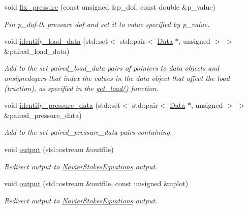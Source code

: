 \begin{DoxyCompactItemize}
void \hyperlink{classoomph_1_1GeneralisedNewtonianTCrouzeixRaviartElement_a72e4201a4143b74992996e34df7eeb1f}{fix\+\_\+pressure} (const unsigned \&p\+\_\+dof, const double \&p\+\_\+value)
\begin{DoxyCompactList}\small\item\em Pin p\+\_\+dof-\/th pressure dof and set it to value specified by p\+\_\+value. \end{DoxyCompactList}\item 
void \hyperlink{classoomph_1_1GeneralisedNewtonianTCrouzeixRaviartElement_a85b72520add7d7bc30e3b9229a6b73fd}{identify\+\_\+load\+\_\+data} (std\+::set$<$ std\+::pair$<$ \hyperlink{classoomph_1_1Data}{Data} $\ast$, unsigned $>$ $>$ \&paired\+\_\+load\+\_\+data)
\begin{DoxyCompactList}\small\item\em Add to the set paired\+\_\+load\+\_\+data pairs of pointers to data objects and unsignedegers that index the values in the data object that affect the load (traction), as specified in the \hyperlink{classoomph_1_1GeneralisedNewtonianNavierStokesEquations_ad69fe16e07deef80069fb1b27c19caa1}{get\+\_\+load()} function. \end{DoxyCompactList}\item 
void \hyperlink{classoomph_1_1GeneralisedNewtonianTCrouzeixRaviartElement_a9b7ff8a20c83f19dd4154105b4d11487}{identify\+\_\+pressure\+\_\+data} (std\+::set$<$ std\+::pair$<$ \hyperlink{classoomph_1_1Data}{Data} $\ast$, unsigned $>$ $>$ \&paired\+\_\+pressure\+\_\+data)
\begin{DoxyCompactList}\small\item\em Add to the set {\ttfamily paired\+\_\+pressure\+\_\+data} pairs containing. \end{DoxyCompactList}\item 
void \hyperlink{classoomph_1_1GeneralisedNewtonianTCrouzeixRaviartElement_a483703d25945a08046f0792e0321bc59}{output} (std\+::ostream \&outfile)
\begin{DoxyCompactList}\small\item\em Redirect output to \hyperlink{classoomph_1_1NavierStokesEquations}{Navier\+Stokes\+Equations} output. \end{DoxyCompactList}\item 
void \hyperlink{classoomph_1_1GeneralisedNewtonianTCrouzeixRaviartElement_a56bdad45189809ed1a288727e63fdb7e}{output} (std\+::ostream \&outfile, const unsigned \&nplot)
\begin{DoxyCompactList}\small\item\em Redirect output to \hyperlink{classoomph_1_1NavierStokesEquations}{Navier\+Stokes\+Equations} output. \end{DoxyCompactList}\item 

\end{DoxyCompactItemize}
